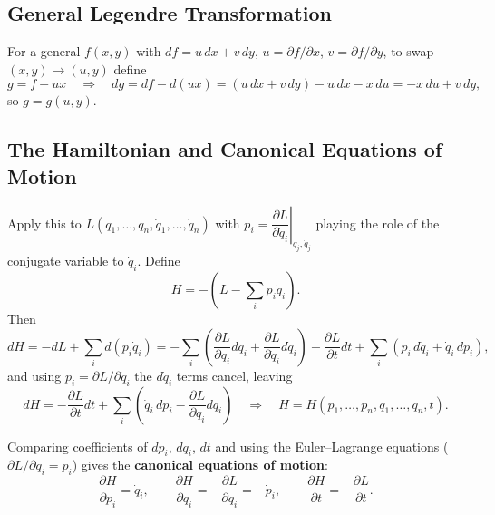 \documentclass[11pt]{article}
\begin{document}
\subsection{General Legendre Transformation}

For a general $f(x,y)$ with $df = u\,dx + v\,dy$, $u = \partial f/\partial x$, $v=\partial f/\partial y$,
to swap $(x,y)\to(u,y)$ define
\[
g = f - ux \quad\Longrightarrow\quad dg = df - d(ux) = (u\,dx+v\,dy) - u\,dx - x\,du = -x\,du + v\,dy,
\]
so $g = g(u,y)$.

\subsection{The Hamiltonian and Canonical Equations of Motion}

Apply this to $L(q_1,\dots,q_n,\dot q_1,\dots,\dot q_n)$ with $p_i = \left.\dfrac{\partial L}{\partial \dot q_i}\right|_{q_j,\dot q_j}$
playing the role of the conjugate variable to $\dot q_i$. Define
\[
H = -\left(L - \sum_i p_i \dot q_i\right).
\]
Then
\[
dH = -dL + \sum_i d(p_i \dot q_i)
= -\sum_i\left(\frac{\partial L}{\partial q_i}dq_i + \frac{\partial L}{\partial \dot q_i}d\dot q_i\right) - \frac{\partial L}{\partial t}dt+ \sum_i\left(p_i\, d\dot q_i + \dot q_i\, dp_i\right),
\]
and using $p_i = \partial L/\partial \dot q_i$ the $d\dot q_i$ terms cancel, leaving
\[
dH = -\frac{\partial L}{\partial t}dt + \sum_i\left(\dot q_i\, dp_i - \frac{\partial L}{\partial q_i}dq_i\right)
\quad\Longrightarrow\quad H = H(p_1,\dots,p_n,q_1,\dots,q_n,t).
\]

Comparing coefficients of $dp_i$, $dq_i$, $dt$ and using the Euler--Lagrange equations
($\partial L/\partial q_i = \dot p_i$) gives the \textbf{canonical equations of motion}:
\begin{equation}
\boxed{\frac{\partial H}{\partial p_i} = \dot q_i, \qquad
\frac{\partial H}{\partial q_i} = -\frac{\partial L}{\partial q_i} = -\dot p_i, \qquad
\frac{\partial H}{\partial t} = -\frac{\partial L}{\partial t}.}
\end{equation}
\end{document}
